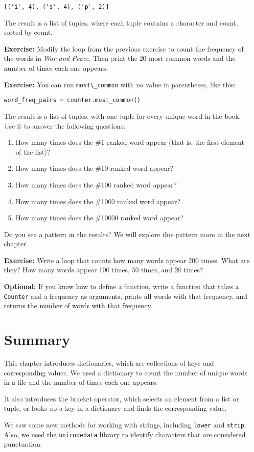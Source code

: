\begin{lstlisting}[style=output]
[('i', 4), ('s', 4), ('p', 2)]
\end{lstlisting}

The result is a list of tuples, where each tuple contains a character
and count, sorted by count.

\textbf{Exercise:} Modify the loop from the previous exercise to count
the frequency of the words in \emph{War and Peace}. Then print the 20
most common words and the number of times each one appears.

\textbf{Exercise:} You can run \passthrough{\lstinline!most\_common!}
with no value in parentheses, like this:

\begin{lstlisting}[style=output]
word_freq_pairs = counter.most_common()
\end{lstlisting}

The result is a list of tuples, with one tuple for every unique word in
the book. Use it to answer the following questions:

\begin{enumerate}
\def\labelenumi{\arabic{enumi}.}
\item
  How many times does the \#1 ranked word appear (that is, the first
  element of the list)?
\item
  How many times does the \#10 ranked word appear?
\item
  How many times does the \#100 ranked word appear?
\item
  How many times does the \#1000 ranked word appear?
\item
  How many times does the \#10000 ranked word appear?
\end{enumerate}

Do you see a pattern in the results? We will explore this pattern more
in the next chapter.

\textbf{Exercise:} Write a loop that counts how many words appear 200
times. What are they? How many words appear 100 times, 50 times, and 20
times?

\textbf{Optional:} If you know how to define a function, write a
function that takes a \passthrough{\lstinline!Counter!} and a frequency
as arguments, prints all words with that frequency, and returns the
number of words with that frequency.

\section{Summary}\label{summary}

This chapter introduces dictionaries, which are collections of keys and
corresponding values. We used a dictionary to count the number of unique
words in a file and the number of times each one appears.

It also introduces the bracket operator, which selects an element from a
list or tuple, or looks up a key in a dictionary and finds the
corresponding value.

We saw some new methods for working with strings, including
\passthrough{\lstinline!lower!} and \passthrough{\lstinline!strip!}.
Also, we used the \passthrough{\lstinline!unicodedata!} library to
identify characters that are considered punctuation.
